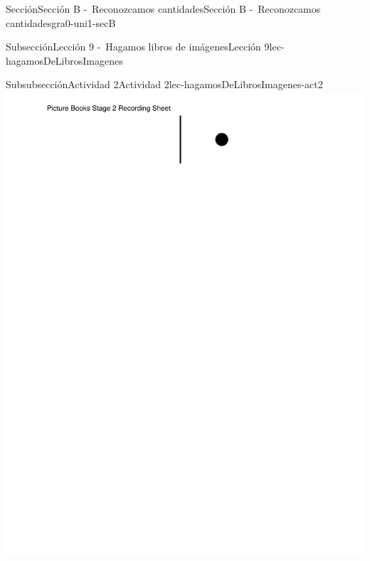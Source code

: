 \begin{sectionptx}{Sección}{Sección B -~Reconozcamos cantidades}{}{Sección B -~Reconozcamos cantidades}{}{}{gra0-uni1-secB}
\begin{subsectionptx}{Subsección}{Lección 9 -~Hagamos libros de imágenes}{}{Lección 9}{}{}{lec-hagamosDeLibrosImagenes}
\begin{subsubsectionptx}{Subsubsección}{Actividad 2}{}{Actividad 2}{}{}{lec-hagamosDeLibrosImagenes-act2}
\includegraphics[page=3, rotate=90, trim=90 35 35 35, clip, width=\linewidth, center]{external/blm/pdf-source/center-picture-books-k-5-stage-2-create-picture-books-stage-2-recording-sheet.pdf}
\end{subsubsectionptx}
\end{subsectionptx}
\end{sectionptx}
%
%
\typeout{************************************************}
\typeout{************************************************}
%
